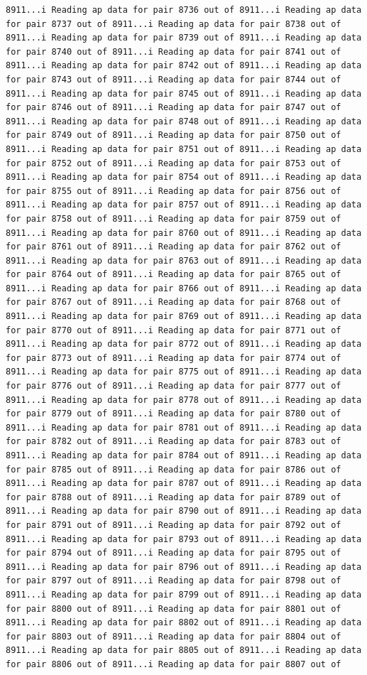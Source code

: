 \documentclass[
]{article}
\begin{document}
\begin{verbatim}
8911...i Reading ap data for pair 8736 out of 8911...i Reading ap data for pair 8737 out of 8911...i Reading ap data for pair 8738 out of 8911...i Reading ap data for pair 8739 out of 8911...i Reading ap data for pair 8740 out of 8911...i Reading ap data for pair 8741 out of 8911...i Reading ap data for pair 8742 out of 8911...i Reading ap data for pair 8743 out of 8911...i Reading ap data for pair 8744 out of 8911...i Reading ap data for pair 8745 out of 8911...i Reading ap data for pair 8746 out of 8911...i Reading ap data for pair 8747 out of 8911...i Reading ap data for pair 8748 out of 8911...i Reading ap data for pair 8749 out of 8911...i Reading ap data for pair 8750 out of 8911...i Reading ap data for pair 8751 out of 8911...i Reading ap data for pair 8752 out of 8911...i Reading ap data for pair 8753 out of 8911...i Reading ap data for pair 8754 out of 8911...i Reading ap data for pair 8755 out of 8911...i Reading ap data for pair 8756 out of 8911...i Reading ap data for pair 8757 out of 8911...i Reading ap data for pair 8758 out of 8911...i Reading ap data for pair 8759 out of 8911...i Reading ap data for pair 8760 out of 8911...i Reading ap data for pair 8761 out of 8911...i Reading ap data for pair 8762 out of 8911...i Reading ap data for pair 8763 out of 8911...i Reading ap data for pair 8764 out of 8911...i Reading ap data for pair 8765 out of 8911...i Reading ap data for pair 8766 out of 8911...i Reading ap data for pair 8767 out of 8911...i Reading ap data for pair 8768 out of 8911...i Reading ap data for pair 8769 out of 8911...i Reading ap data for pair 8770 out of 8911...i Reading ap data for pair 8771 out of 8911...i Reading ap data for pair 8772 out of 8911...i Reading ap data for pair 8773 out of 8911...i Reading ap data for pair 8774 out of 8911...i Reading ap data for pair 8775 out of 8911...i Reading ap data for pair 8776 out of 8911...i Reading ap data for pair 8777 out of 8911...i Reading ap data for pair 8778 out of 8911...i Reading ap data for pair 8779 out of 8911...i Reading ap data for pair 8780 out of 8911...i Reading ap data for pair 8781 out of 8911...i Reading ap data for pair 8782 out of 8911...i Reading ap data for pair 8783 out of 8911...i Reading ap data for pair 8784 out of 8911...i Reading ap data for pair 8785 out of 8911...i Reading ap data for pair 8786 out of 8911...i Reading ap data for pair 8787 out of 8911...i Reading ap data for pair 8788 out of 8911...i Reading ap data for pair 8789 out of 8911...i Reading ap data for pair 8790 out of 8911...i Reading ap data for pair 8791 out of 8911...i Reading ap data for pair 8792 out of 8911...i Reading ap data for pair 8793 out of 8911...i Reading ap data for pair 8794 out of 8911...i Reading ap data for pair 8795 out of 8911...i Reading ap data for pair 8796 out of 8911...i Reading ap data for pair 8797 out of 8911...i Reading ap data for pair 8798 out of 8911...i Reading ap data for pair 8799 out of 8911...i Reading ap data for pair 8800 out of 8911...i Reading ap data for pair 8801 out of 8911...i Reading ap data for pair 8802 out of 8911...i Reading ap data for pair 8803 out of 8911...i Reading ap data for pair 8804 out of 8911...i Reading ap data for pair 8805 out of 8911...i Reading ap data for pair 8806 out of 8911...i Reading ap data for pair 8807 out of 
\end{verbatim}
\end{document}

